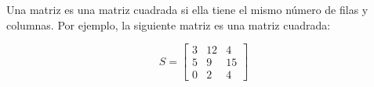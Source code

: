 Una matriz es una matriz cuadrada si ella tiene el mismo número de filas y columnas. Por ejemplo, la siguiente matriz es una matriz cuadrada:

$$
S = \begin{bmatrix}
	3	& 12& 4  \\
	5	& 9 & 15 \\
	0	& 2 & 4
\end{bmatrix}$$